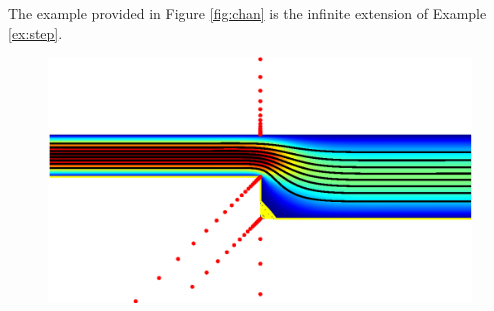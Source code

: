 \documentclass{article}
\newcounter{example}[section]
\begin{document}
The example provided in Figure \ref{fig:chan} is the infinite extension of Example \ref{ex:step}.
\begin{figure}[H]
	\centering
	\includegraphics[width=\linewidth]{Figures/chan}
	

\end{figure}
\end{document}
